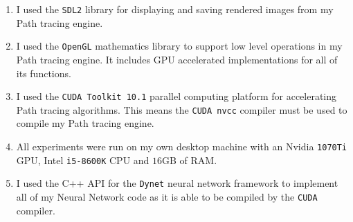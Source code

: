 \documentclass[ %
                    author={Callum Pearce},
                supervisor={Dr. Neill Campbell},
                    degree={MEng},
                     title={How effective are Temporal difference learning methods for reducing the number of zero contribution light paths while still accurately approximating Global Illumination in Path tracing?},
                  subtitle={},
                      type={research},
                      year={2019} ]{dissertation}
\begin{document}

\begin{enumerate}
\item I used the \verb|SDL2|  library for displaying and saving rendered 
images from my Path tracing engine.

\item I used the \verb|OpenGL| mathematics library to support low level 
operations in my Path tracing engine. It includes GPU accelerated 
 implementations for all of its functions.
 
\item I used the \verb|CUDA Toolkit 10.1| parallel computing platform for
 accelerating Path tracing algorithms. This means the \verb|CUDA nvcc|
 compiler must be used to compile my Path tracing engine.

\item All experiments were run on my own desktop machine with an
Nvidia \verb|1070Ti| GPU, Intel \verb|i5-8600K| CPU and $16$GB of RAM.

\item I used the C++ API for the \verb|Dynet| neural network framework 
to implement all of my Neural Network code as it is able to be compiled
by the \verb|CUDA| compiler.
\end{enumerate}
\end{document}
